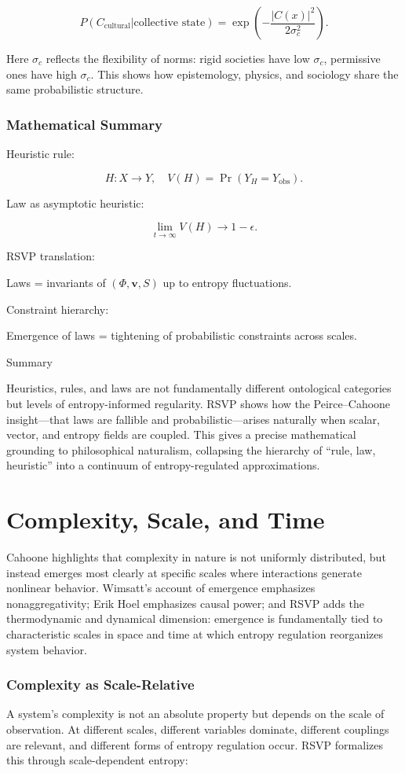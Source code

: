\documentclass[12pt]{book}
\begin{document}
\[ P(C_{\text{cultural}} | \text{collective state}) = \exp\!\left(-\frac{|C(x)|^2}{2\sigma_c^2}\right). \]

Here \( \sigma_c \) reflects the flexibility of norms: rigid societies have low \( \sigma_c \), permissive ones have high \( \sigma_c \). This shows how epistemology, physics, and sociology share the same probabilistic structure.

\subsection{Mathematical Summary}
Heuristic rule:

\[ H: X \to Y, \quad V(H) = \Pr(Y_H = Y_{\text{obs}}). \]

Law as asymptotic heuristic:

\[ \lim_{t \to \infty} V(H) \to 1 - \epsilon. \]

RSVP translation:

Laws = invariants of \( (\Phi, \mathbf{v}, S) \) up to entropy fluctuations.

Constraint hierarchy:

Emergence of laws = tightening of probabilistic constraints across scales.

Summary

Heuristics, rules, and laws are not fundamentally different ontological categories but levels of entropy-informed regularity. RSVP shows how the Peirce–Cahoone insight—that laws are fallible and probabilistic—arises naturally when scalar, vector, and entropy fields are coupled. This gives a precise mathematical grounding to philosophical naturalism, collapsing the hierarchy of “rule, law, heuristic” into a continuum of entropy-regulated approximations.

\chapter{Complexity, Scale, and Time}
Cahoone highlights that complexity in nature is not uniformly distributed, but instead emerges most clearly at specific scales where interactions generate nonlinear behavior. Wimsatt’s account of emergence emphasizes nonaggregativity; Erik Hoel emphasizes causal power; and RSVP adds the thermodynamic and dynamical dimension: emergence is fundamentally tied to characteristic scales in space and time at which entropy regulation reorganizes system behavior.

\subsection{Complexity as Scale-Relative}
A system’s complexity is not an absolute property but depends on the scale of observation. At different scales, different variables dominate, different couplings are relevant, and different forms of entropy regulation occur. RSVP formalizes this through scale-dependent entropy:
\end{document}
